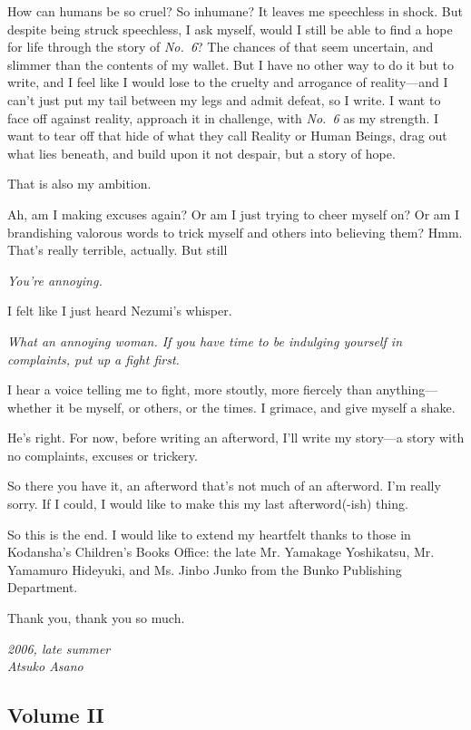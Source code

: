 How can humans be so cruel? So inhumane? It leaves me speechless in
shock. But despite being struck speechless, I ask myself, would I still
be able to find a hope for life through the story of \emph{No.~6}? The chances
of that seem uncertain, and slimmer than the contents of my wallet. But
I have no other way to do it but to write, and I feel like I would lose
to the cruelty and arrogance of reality---and I can't just put my tail
between my legs and admit defeat, so I write. I want to face off against
reality, approach it in challenge, with \emph{No.~6} as my strength. I want to
tear off that hide of what they call Reality or Human Beings, drag out
what lies beneath, and build upon it not despair, but a story of hope.

That is also my ambition.

Ah, am I making excuses again? Or am I just trying to cheer myself on?
Or am I brandishing valorous words to trick myself and others into
believing them? Hmm. That's really terrible, actually. But still\el 

\emph{You're annoying.}

I felt like I just heard Nezumi's whisper.

\emph{What an annoying woman. If you have time to be indulging yourself
in complaints, put up a fight first.}

I hear a voice telling me to fight, more stoutly, more fiercely than
anything---whether it be myself, or others, or the times. I grimace, and
give myself a shake.

He's right. For now, before writing an afterword, I'll write my story---a
story with no complaints, excuses or trickery.

So there you have it, an afterword that's not much of an afterword. I'm
really sorry. If I could, I would like to make this my last
afterword(-ish) thing.

So this is the end. I would like to extend my heartfelt thanks to those
in Kodansha's Children's Books Office: the late Mr. Yamakage Yoshikatsu,
Mr. Yamamuro Hideyuki, and Ms. Jinbo Junko from the Bunko Publishing
Department.

Thank you, thank you so much.

\myspace

\emph{2006, late summer\\
Atsuko Asano}

\clearpage
\subsection{Volume II}
